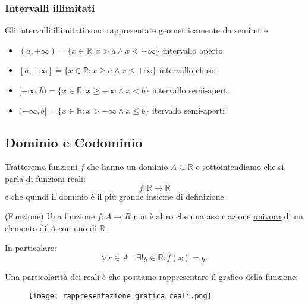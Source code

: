 \documentclass[main.tex]{subfiles}
\begin{document}
\subsubsection{Intervalli illimitati}
Gli intervalli illimitati sono rappresentate geometricamente da semirette

\begin{itemize}
        \item $ (a,+\infty) = \{x \in \mathbb{R} : x>a \wedge x<+\infty\} $ intervallo aperto
        \item $ [a,+\infty] = \{x \in \mathbb{R} : x\ge a \wedge x\le +\infty\} $ intervallo chuso
        \item $ [-\infty,b) = \{x \in \mathbb{R} : x\ge -\infty \wedge x<b\} $ intervallo semi-aperti
        \item $ (-\infty,b] = \{x \in \mathbb{R} : x>-\infty \wedge x\le b\} $ itervallo semi-aperti
\end{itemize}


\subsection{Dominio e Codominio}\label{sec:}
Tratteremo funzioni $ f $ che hanno un dominio $ A \subseteq \mathbb{R}$ e sottointendiamo che si parla di funzioni reali:
\begin{equation*}
        f : \mathbb{R} \to \mathbb{R}
\end{equation*}
e che quindi il dominio è il più grande insieme di definizione.

\begin{definition}
        (Funzione) Una funzione $ f:A \to R $ non è altro che una associazione \underline{univoca} di un elemento di $ A $ con uno di $ \mathbb{R} $. \par
        In particolare:
\begin{equation*}
        \forall x \in A \quad \exists! y\in\mathbb{R} : f(x) = g.
\end{equation*}
\end{definition}


\begin{tcolorbox}
\begin{prop}
       Una particolarità dei reali è che possiamo rappresentare il grafico della funzione:
\end{prop}
\end{tcolorbox}
\begin{figure}[H]
  	\texttt{[image: rappresentazione\_grafica\_reali.png]}
  	\caption{}
        \label{fig:rappresentazione_grafica_reali.png}
\end{figure}
\end{document}
